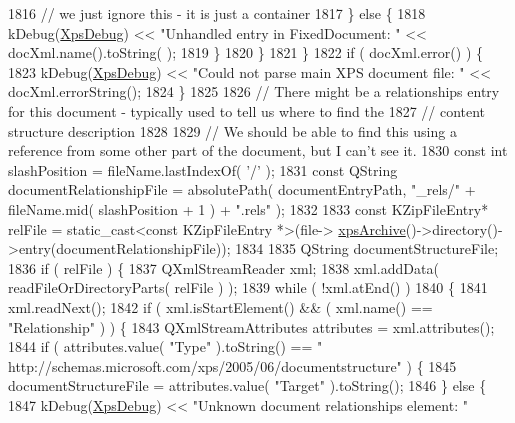 \begin{DoxyCode}
1816                 \textcolor{comment}{// we just ignore this - it is just a container}
1817             \} \textcolor{keywordflow}{else} \{
1818                 kDebug(\hyperlink{generator__xps_8cpp_a00c0825a8bf77ed142d9a5a205d66f3c}{XpsDebug}) << \textcolor{stringliteral}{"Unhandled entry in FixedDocument: "} << docXml.name().toString(
      );
1819             \}
1820         \}
1821     \}
1822     \textcolor{keywordflow}{if} ( docXml.error() ) \{
1823         kDebug(\hyperlink{generator__xps_8cpp_a00c0825a8bf77ed142d9a5a205d66f3c}{XpsDebug}) << \textcolor{stringliteral}{"Could not parse main XPS document file: "} << docXml.errorString();
1824     \}
1825 
1826     \textcolor{comment}{// There might be a relationships entry for this document - typically used to tell us where to find the}
1827     \textcolor{comment}{// content structure description}
1828 
1829     \textcolor{comment}{// We should be able to find this using a reference from some other part of the document, but I can't
       see it.}
1830     \textcolor{keyword}{const} \textcolor{keywordtype}{int} slashPosition = fileName.lastIndexOf( \textcolor{charliteral}{'/'} );
1831     \textcolor{keyword}{const} QString documentRelationshipFile = absolutePath( documentEntryPath, \textcolor{stringliteral}{"\_rels/"} + fileName.mid( 
      slashPosition + 1 ) + \textcolor{stringliteral}{".rels"} );
1832 
1833     \textcolor{keyword}{const} KZipFileEntry* relFile = \textcolor{keyword}{static\_cast<}\textcolor{keyword}{const }KZipFileEntry *\textcolor{keyword}{>}(file->
      \hyperlink{classXpsFile_a13a633163a15934693b3c65eae2a0c4f}{xpsArchive}()->directory()->entry(documentRelationshipFile));
1834 
1835     QString documentStructureFile;
1836     \textcolor{keywordflow}{if} ( relFile ) \{
1837         QXmlStreamReader xml;
1838         xml.addData( readFileOrDirectoryParts( relFile ) );
1839         \textcolor{keywordflow}{while} ( !xml.atEnd() )
1840         \{
1841             xml.readNext();
1842             \textcolor{keywordflow}{if} ( xml.isStartElement() && ( xml.name() == \textcolor{stringliteral}{"Relationship"} ) ) \{
1843                 QXmlStreamAttributes attributes = xml.attributes();
1844                 \textcolor{keywordflow}{if} ( attributes.value( \textcolor{stringliteral}{"Type"} ).toString() == \textcolor{stringliteral}{"
      http://schemas.microsoft.com/xps/2005/06/documentstructure"} ) \{
1845                     documentStructureFile  = attributes.value( \textcolor{stringliteral}{"Target"} ).toString();
1846                 \} \textcolor{keywordflow}{else} \{
1847                     kDebug(\hyperlink{generator__xps_8cpp_a00c0825a8bf77ed142d9a5a205d66f3c}{XpsDebug}) << \textcolor{stringliteral}{"Unknown document relationships element: "}

\end{DoxyCode}
